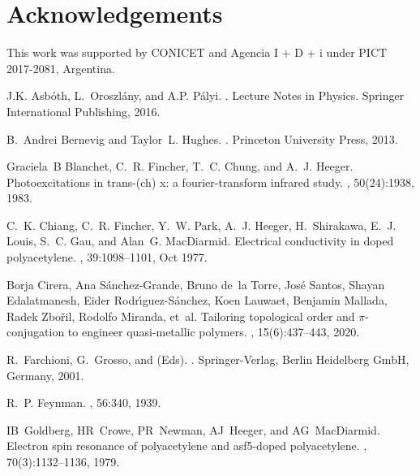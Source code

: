 \documentclass[10pt,a4paper]{article}
\begin{document}
\section*{Acknowledgements}
This work was supported by CONICET and Agencia
I + D + i under PICT 2017-2081, Argentina.

\begin{thebibliography}{10}

J.K. Asb{\'o}th, L.~Oroszl{\'a}ny, and A.P. P{\'a}lyi.
.
\newblock Lecture Notes in Physics. Springer International Publishing, 2016.

B.~Andrei Bernevig and Taylor~L. Hughes.
.
\newblock Princeton University Press, 2013.

Graciela~B Blanchet, C.~R. Fincher, T.~C. Chung, and A.~J. Heeger.
\newblock Photoexcitations in trans-(ch) x: a fourier-transform infrared study.
, 50(24):1938, 1983.

C.~K. Chiang, C.~R. Fincher, Y.~W. Park, A.~J. Heeger, H.~Shirakawa, E.~J.
  Louis, S.~C. Gau, and Alan~G. MacDiarmid.
\newblock Electrical conductivity in doped polyacetylene.
, 39:1098--1101, Oct 1977.

Borja Cirera, Ana S{\'a}nchez-Grande, Bruno de~la Torre, Jos{\'e} Santos,
  Shayan Edalatmanesh, Eider Rodr{\'\i}guez-S{\'a}nchez, Koen Lauwaet, Benjamin
  Mallada, Radek Zbo{\v{r}}il, Rodolfo Miranda, et~al.
\newblock Tailoring topological order and $\pi$-conjugation to engineer
  quasi-metallic polymers.
, 15(6):437--443, 2020.

R.~Farchioni, G.~Grosso, and (Eds).
.
\newblock Springer-Verlag, Berlin Heidelberg GmbH, Germany, 2001.

R.~P. Feynman.
, 56:340, 1939.

IB~Goldberg, HR~Crowe, PR~Newman, AJ~Heeger, and AG~MacDiarmid.
\newblock Electron spin resonance of polyacetylene and asf5-doped
  polyacetylene.
, 70(3):1132--1136, 1979.


\end{thebibliography}
\end{document}
